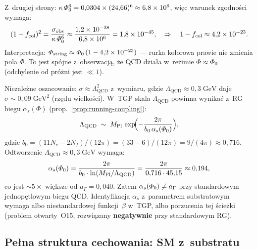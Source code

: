 \begin{proposition}
Z~drugiej strony:
$\kappa\,\varPhi_0^6 = 0{,}0304 \times (24{,}66)^6 \approx 6{,}8 \times 10^{6}$,
więc warunek zgodności wymaga:
\begin{equation}\label{eq:fcol-from-sigma}
    (1 - f_{\mathrm{col}})^2 = \frac{\sigma_{\mathrm{obs}}}{\kappa\,\varPhi_0^6}
    \approx \frac{1{,}2 \times 10^{-38}}{6{,}8 \times 10^{6}}
    = 1{,}8 \times 10^{-45},
    \quad\Rightarrow\quad
    1 - f_{\mathrm{col}} \approx 4{,}2 \times 10^{-23}.
\end{equation}
Interpretacja: $\varPhi_{\mathrm{string}} \approx \varPhi_0\,(1 - 4{,}2\times 10^{-23})$
--- rurka kolorowa prawie nie zmienia pola $\Phi$.
To jest spójne z~obserwacją, że QCD działa w~reżimie
$\varPhi \approx \varPhi_0$ (odchylenie od próżni jest $\ll 1$).
\end{proposition}

\begin{remark}%
\label{rem:sigma-alt}
Niezależne oszacowanie: $\sigma \approx \Lambda_{\mathrm{QCD}}^2$
z~wymiaru, gdzie $\Lambda_{\mathrm{QCD}} \approx 0{,}3\;\mathrm{GeV}$
daje $\sigma \sim 0{,}09\;\mathrm{GeV}^2$ (rzędu wielkości).
W~TGP skala $\Lambda_{\mathrm{QCD}}$ powinna wynikać z~RG biegu
$\alpha_s(\Phi)$ (prop.~\ref{prop:running-coupling}):
\begin{equation}\label{eq:LQCD-from-TGP}
    \Lambda_{\mathrm{QCD}} \;\sim\; M_{\mathrm{Pl}}\,
    \exp\!\Bigl(-\frac{2\pi}{b_0\,\alpha_s(\varPhi_0)}\Bigr),
\end{equation}
gdzie $b_0 = (11N_c - 2N_f)/(12\pi) = (33-6)/(12\pi) = 9/(4\pi) \approx 0{,}716$.
Odtworzenie $\Lambda_{\mathrm{QCD}} \approx 0{,}3\;\mathrm{GeV}$
wymaga:
\begin{equation}\label{eq:alphas-required}
    \alpha_s(\varPhi_0) = \frac{2\pi}{b_0 \cdot \ln(M_{\mathrm{Pl}}/\Lambda_{\mathrm{QCD}})}
    = \frac{2\pi}{0{,}716 \cdot 45{,}15} \approx 0{,}194,
\end{equation}
co jest $\sim 5\times$ większe od $a_{\Gamma} = 0{,}040$.
Zatem $\alpha_s(\varPhi_0) \neq a_{\Gamma}$ przy standardowym
jednopętlowym biegu QCD. Identyfikacja $\alpha_s$ z~parametrem
substratowym wymaga albo niestandardowej funkcji~$\beta$ w~TGP,
albo porzucenia tej ścieżki (problem otwarty~O15, rozwiązany
\textbf{negatywnie} przy standardowym RG).
\end{remark}

\subsection{Pełna struktura cechowania: SM z~substratu}%
\label{ssec:full-gauge}

